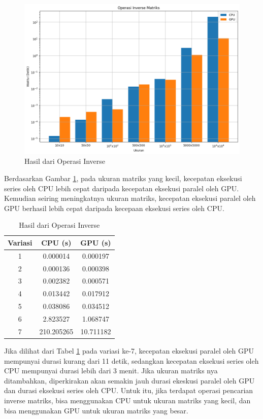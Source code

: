 \begin{figure}[H]
	\centering
	\includegraphics[width=14cm, scale=1]{images/penelitian/inverse.png}
	\caption{Hasil dari Operasi Inverse}
	\label{img:result_inverse}
\end{figure}

Berdasarkan Gambar \ref{img:result_inverse}, pada ukuran matriks yang kecil, kecepatan eksekusi series oleh CPU lebih cepat daripada kecepatan eksekusi paralel oleh GPU. Kemudian seiring meningkatnya ukuran matriks, kecepatan eksekusi paralel oleh GPU berhasil lebih cepat daripada kecepaan eksekusi series oleh CPU.

\begin{table}[H]
	\centering
	\caption{Hasil dari Operasi Inverse}
	\label{tab:result_inverse}
	\begin{tabular}{ccc}
		\toprule
		Variasi & CPU (s)    & GPU (s)   \\
		\midrule
		1       & 0.000014   & 0.000197  \\
		2       & 0.000136   & 0.000398  \\
		3       & 0.002382   & 0.000571  \\
		4       & 0.013442   & 0.017912  \\
		5       & 0.038086   & 0.034512  \\
		6       & 2.823527   & 1.068747  \\
		7       & 210.205265 & 10.711182 \\
		\bottomrule
	\end{tabular}
\end{table}

Jika dilihat dari Tabel \ref{tab:result_inverse} pada variasi ke-7, kecepatan eksekusi paralel oleh GPU mempunyai durasi kurang dari 11 detik, sedangkan kecepatan eksekusi series oleh CPU mempunyai durasi lebih dari 3 menit. Jika ukuran matriks nya ditambahkan, diperkirakan akan semakin jauh durasi ekeskusi paralel oleh GPU dan durasi eksekusi series oleh CPU. Untuk itu, jika terdapat operasi pencarian inverse matriks, bisa menggunakan CPU untuk ukuran matriks yang kecil, dan bisa menggunakan GPU untuk ukuran matriks yang besar.

